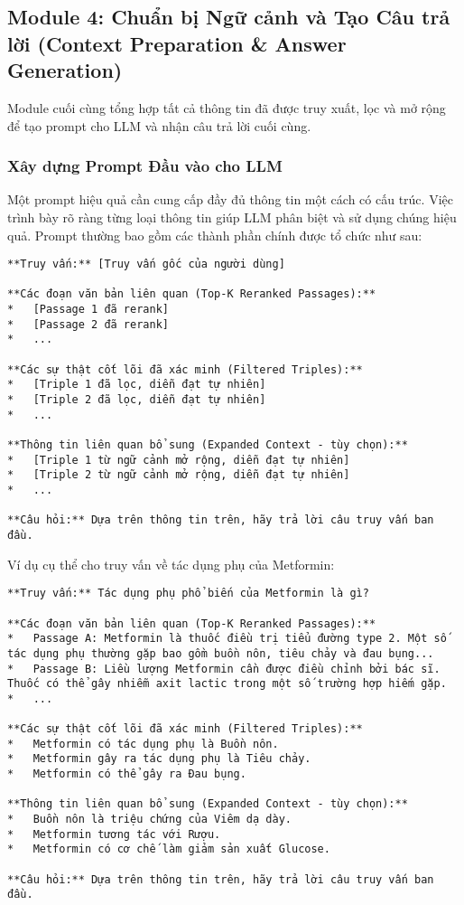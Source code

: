 \documentclass[../main.tex]{subfiles}
\begin{document}
\subsection{Module 4: Chuẩn bị Ngữ cảnh và Tạo Câu trả lời (Context Preparation \& Answer Generation)}

Module cuối cùng tổng hợp tất cả thông tin đã được truy xuất, lọc và mở rộng để tạo prompt cho LLM và nhận câu trả lời cuối cùng.

\subsubsection{Xây dựng Prompt Đầu vào cho LLM}

Một prompt hiệu quả cần cung cấp đầy đủ thông tin một cách có cấu trúc. Việc trình bày rõ ràng từng loại thông tin giúp LLM phân biệt và sử dụng chúng hiệu quả. Prompt thường bao gồm các thành phần chính được tổ chức như sau:

\begin{verbatim}
**Truy vấn:** [Truy vấn gốc của người dùng]

**Các đoạn văn bản liên quan (Top-K Reranked Passages):**
*   [Passage 1 đã rerank]
*   [Passage 2 đã rerank]
*   ...

**Các sự thật cốt lõi đã xác minh (Filtered Triples):**
*   [Triple 1 đã lọc, diễn đạt tự nhiên]
*   [Triple 2 đã lọc, diễn đạt tự nhiên]
*   ...

**Thông tin liên quan bổ sung (Expanded Context - tùy chọn):**
*   [Triple 1 từ ngữ cảnh mở rộng, diễn đạt tự nhiên]
*   [Triple 2 từ ngữ cảnh mở rộng, diễn đạt tự nhiên]
*   ...

**Câu hỏi:** Dựa trên thông tin trên, hãy trả lời câu truy vấn ban đầu.
\end{verbatim}

Ví dụ cụ thể cho truy vấn về tác dụng phụ của Metformin:

\begin{verbatim}
**Truy vấn:** Tác dụng phụ phổ biến của Metformin là gì?

**Các đoạn văn bản liên quan (Top-K Reranked Passages):**
*   Passage A: Metformin là thuốc điều trị tiểu đường type 2. Một số tác dụng phụ thường gặp bao gồm buồn nôn, tiêu chảy và đau bụng...
*   Passage B: Liều lượng Metformin cần được điều chỉnh bởi bác sĩ. Thuốc có thể gây nhiễm axit lactic trong một số trường hợp hiếm gặp.
*   ...

**Các sự thật cốt lõi đã xác minh (Filtered Triples):**
*   Metformin có tác dụng phụ là Buồn nôn.
*   Metformin gây ra tác dụng phụ là Tiêu chảy.
*   Metformin có thể gây ra Đau bụng.

**Thông tin liên quan bổ sung (Expanded Context - tùy chọn):**
*   Buồn nôn là triệu chứng của Viêm dạ dày.
*   Metformin tương tác với Rượu.
*   Metformin có cơ chế làm giảm sản xuất Glucose.

**Câu hỏi:** Dựa trên thông tin trên, hãy trả lời câu truy vấn ban đầu.
\end{verbatim}
\end{document}
